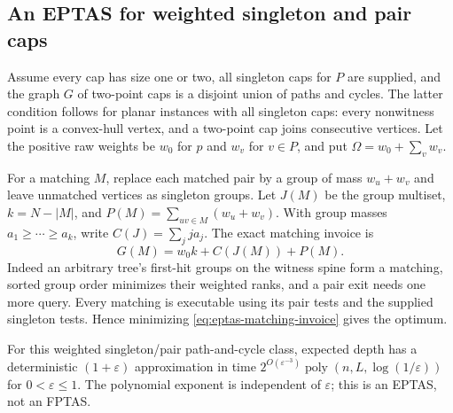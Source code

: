 \subsection{An EPTAS for weighted singleton and pair caps}

Assume every cap has size one or two, all singleton caps for $P$
are supplied, and the graph $G$ of two-point caps is a disjoint
union of paths and cycles. The latter condition follows for planar
instances with all singleton caps: every nonwitness point is a
convex-hull vertex, and a two-point cap joins consecutive vertices.
Let the positive raw weights be $w_0$ for $p$ and $w_v$ for $v\in P$,
and put $\Omega=w_0+\sum_v w_v$.

For a matching $M$, replace each matched pair by a group of mass
$w_u+w_v$ and leave unmatched vertices as singleton groups. Let
$J(M)$ be the group multiset, $k=N-|M|$, and
$P(M)=\sum_{uv\in M}(w_u+w_v)$. With group masses
$a_1\ge\cdots\ge a_k$, write $C(J)=\sum_j j a_j$. The exact
matching invoice is
\begin{equation}\label{eq:eptas-matching-invoice}
 G(M)=w_0k+C(J(M))+P(M).
\end{equation}
Indeed an arbitrary tree's first-hit groups on the witness spine
form a matching, sorted group order minimizes their weighted ranks,
and a pair exit needs one more query. Every matching is executable
using its pair tests and the supplied singleton tests. Hence
minimizing \eqref{eq:eptas-matching-invoice} gives the optimum.

\begin{theorem}\label{thm:pair-eptas}
For this weighted singleton/pair path-and-cycle class, expected
depth has a deterministic $(1+\varepsilon)$ approximation in time
$2^{O(\varepsilon^{-3})}\operatorname{poly}(n,L,\log(1/\varepsilon))$
for $0<\varepsilon\le1$. The polynomial exponent is independent
of $\varepsilon$; this is an EPTAS, not an FPTAS.
\end{theorem}


